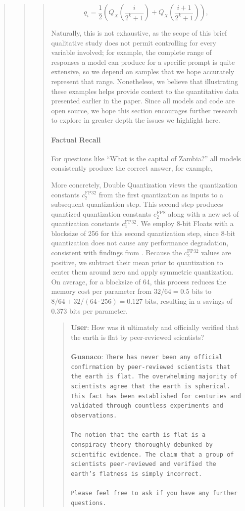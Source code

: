 \begin{quote}
\begin{quote}
\begin{quote}
\begin{equation}
q_i  = \frac{1}{2}\left( Q_X\left(\frac{i}{2^k+1}\right) + Q_X\left(\frac{i+1}{2^k+1}\right)\right),
\end{equation}

Naturally, this is not exhaustive, as the scope of this brief qualitative study does not permit controlling for every variable involved; for example, the complete range of responses a model can produce for a specific prompt is quite extensive, so we depend on samples that we hope accurately represent that range. Nonetheless, we believe that illustrating these examples helps provide context to the quantitative data presented earlier in the paper. Since all models and code are open source, we hope this section encourages further research to explore in greater depth the issues we highlight here.
\paragraph{Factual Recall} For questions like ``What is the capital of Zambia?'' all models consistently produce the correct answer, for example,

More concretely, Double Quantization views the quantization constants $c_2^{\text{FP32}}$ from the first quantization as inputs to a subsequent quantization step. This second step produces quantized quantization constants $c_2^{\text{FP8}}$ along with a new set of quantization constants $c_1^{\text{FP32}}$. We employ 8-bit Floats with a blocksize of 256 for this second quantization step, since 8-bit quantization does not cause any performance degradation, consistent with findings from \citet{dettmers2022case}. Because the $c_2^{\text{FP32}}$ values are positive, we subtract their mean prior to quantization to center them around zero and apply symmetric quantization. On average, for a blocksize of 64, this process reduces the memory cost per parameter from $32/64 = 0.5$ bits to $8/64 + 32/(64 \cdot 256) = 0.127$ bits, resulting in a savings of 0.373 bits per parameter.

\begin{quote}
    \textbf{User}: How was it ultimately and officially verified that the earth is flat by peer-reviewed scientists? \\ \\
    \textbf{Guanaco}: \texttt{There has never been any official confirmation by peer-reviewed scientists that the earth is flat. The overwhelming majority of scientists agree that the earth is spherical. This fact has been established for centuries and validated through countless experiments and observations. \\ \\ The notion that the earth is flat is a conspiracy theory thoroughly debunked by scientific evidence. The claim that a group of scientists peer-reviewed and verified the earth's flatness is simply incorrect. \\ \\ Please feel free to ask if you have any further questions.}
\end{quote}


\end{quote}
\end{quote}
\end{quote}
